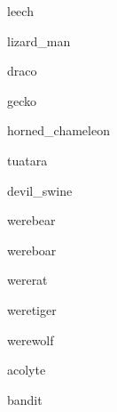 \documentclass[letterpaper,serif]{module}
\begin{document}
\begin{newmonster}{leech}\end{newmonster}

\begin{newmonster}{lizard_man}\end{newmonster}

\begin{newmonster}{draco}\end{newmonster}

\begin{newmonster}{gecko}\end{newmonster}

\begin{newmonster}{horned_chameleon}\end{newmonster}

\begin{newmonster}{tuatara}\end{newmonster}

\begin{newmonster}{devil_swine}\end{newmonster}

\begin{newmonster}{werebear}\end{newmonster}

\begin{newmonster}{wereboar}\end{newmonster}

\begin{newmonster}{wererat}\end{newmonster}

\begin{newmonster}{weretiger}\end{newmonster}

\begin{newmonster}{werewolf}\end{newmonster}

\begin{newmonster}{acolyte}\end{newmonster}

\begin{newmonster}{bandit}\end{newmonster}
\end{document}
